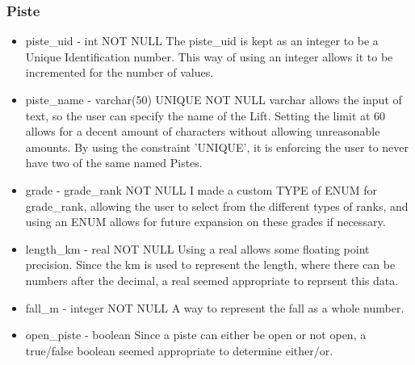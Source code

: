 \documentclass[11pt]{scrartcl} %
\begin{document}
\subsubsection{Piste}
\begin{itemize}
\item piste\_uid - int NOT NULL
The piste\_uid is kept as an integer to be a Unique Identification number. This way of using an integer allows it to be incremented for the number of values.
\item piste\_name - varchar(50) UNIQUE NOT NULL 
varchar allows the input of text, so the user can specify the name of the Lift. Setting the limit at 60 allows for a decent amount of characters without allowing unreasonable amounts. By using the constraint 'UNIQUE', it is enforcing the user to never have two of the same named Pistes.
\item grade - grade\_rank NOT NULL
I made a custom TYPE of ENUM for grade\_rank, allowing the user to select from the different types of ranks, and using an ENUM allows for future expansion on these grades if necessary.
\item length\_km - real NOT NULL
Using a real allows some floating point precision. Since the km is used to represent the length, where there can be numbers after the decimal, a real seemed appropriate to reprsent this data.
\item fall\_m - integer NOT NULL
A way to represent the fall as a whole number.
\item open\_piste - boolean
Since a piste can either be open or not open, a true/false boolean seemed appropriate to determine either/or.
\end{itemize}
\end{document}
